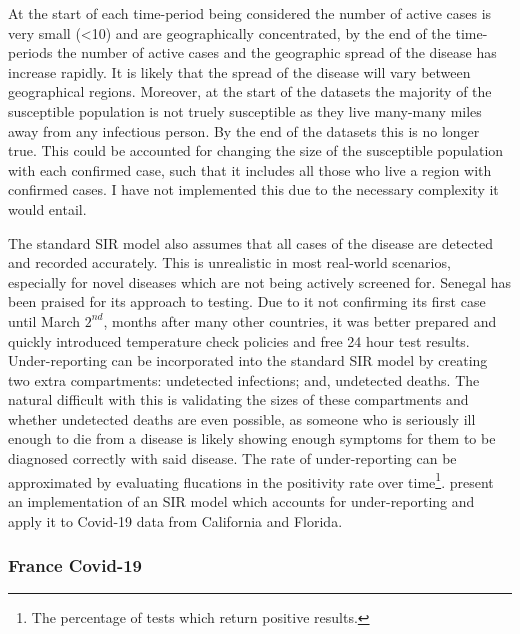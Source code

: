 \documentclass[11pt,a4paper]{article}
\theoremstyle{break}
\begin{document}
  \par At the start of each time-period being considered the number of active cases is very small (<10) and are geographically concentrated, by the end of the time-periods the number of active cases and the geographic spread of the disease has increase rapidly. It is likely that the spread of the disease will vary between geographical regions. Moreover, at the start of the datasets the majority of the susceptible population is not truely susceptible as they live many-many miles away from any infectious person. By the end of the datasets this is no longer true. This could be accounted for changing the size of the susceptible population with each confirmed case, such that it includes all those who live a region with confirmed cases. I have not implemented this due to the necessary complexity it would entail.

  \par The standard SIR model also assumes that all cases of the disease are detected and recorded accurately. This is unrealistic in most real-world scenarios, especially for novel diseases which are not being actively screened for. Senegal has been praised for its approach to testing. Due to it not confirming its first case until March $2^{nd}$, months after many other countries, it was better prepared and quickly introduced temperature check policies and free 24 hour test results. Under-reporting can be incorporated into the standard SIR model by creating two extra compartments: undetected infections; and, undetected deaths. The natural difficult with this is validating the sizes of these compartments and whether undetected deaths are even possible, as someone who is seriously ill enough to die from a disease is likely showing enough symptoms for them to be diagnosed correctly with said disease. The rate of under-reporting can be approximated by evaluating flucations in the positivity rate over time\footnote{The percentage of tests which return positive results.}. \cite[]{sir_model_underreporting} present an implementation of an SIR model which accounts for under-reporting and apply it to Covid-19 data from California and Florida.

\subsubsection{France Covid-19}\label{sec_real_data_france}

\end{document}
